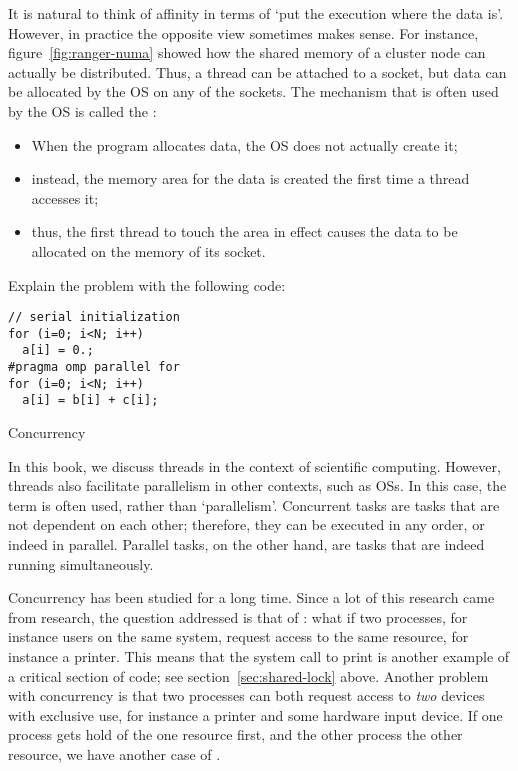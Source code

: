 
It is natural to think of affinity in terms of `put the
execution where the data is'. However, in practice the opposite view
sometimes makes sense.  For instance, figure~\ref{fig:ranger-numa}
showed how the shared memory of a cluster node can actually be
distributed. Thus, a thread can be attached to a socket, but data can
be allocated by the \ac{OS} on any of the sockets.  The mechanism that
is often used by the \ac{OS} is called the :
\begin{itemize}
\item When the program allocates data, the \ac{OS} does not actually
  create it;
\item instead, the memory area for the data is created the first
  time a thread accesses it;
\item thus, the first thread to touch the area in effect causes the
  data to be allocated on the memory of its socket.
\end{itemize}

\begin{exercise}
  Explain the problem with the following code:
\begin{verbatim}
// serial initialization
for (i=0; i<N; i++)
  a[i] = 0.;
#pragma omp parallel for
for (i=0; i<N; i++)
  a[i] = b[i] + c[i];
\end{verbatim}
\end{exercise}


 {Concurrency}

In this book, we discuss threads in the context of scientific
computing. However, threads also facilitate parallelism in other contexts,
such as \acfp{OS}. In this case, the term
 is often used, rather than `parallelism'.
Concurrent tasks are tasks that are not dependent on each other; 
therefore, they can be executed in any order, or indeed in parallel.
Parallel tasks, on the other hand, are tasks that are indeed running 
simultaneously.

Concurrency has been studied for a long time. Since a lot of
this research came from  research,
the question
addressed is that of : what if two
processes, for instance users on the same system, request access to
the same resource, for instance a printer. This means that the system
call to print is another example of a critical section of code; see
section~\ref{sec:shared-lock} above. Another problem with concurrency
is that two processes can both request access to \emph{two} devices
with exclusive use, for instance a printer and some hardware input
device. If one process gets hold of the one resource first, and the
other process the other resource, we have another case of
.

